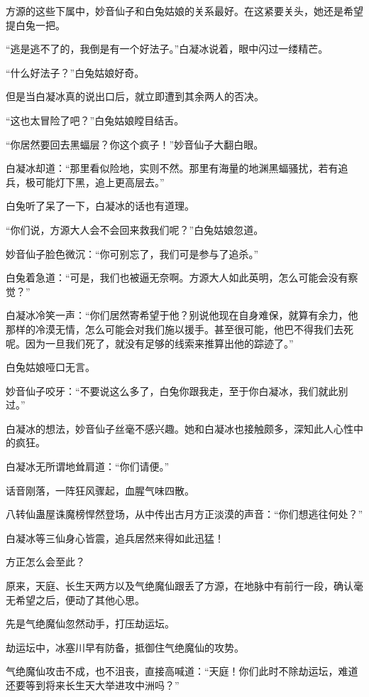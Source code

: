 \begin{this_body}
方源的这些下属中，妙音仙子和白兔姑娘的关系最好。在这紧要关头，她还是希望提白兔一把。

“逃是逃不了的，我倒是有一个好法子。”白凝冰说着，眼中闪过一缕精芒。

“什么好法子？”白兔姑娘好奇。

但是当白凝冰真的说出口后，就立即遭到其余两人的否决。

“这也太冒险了吧？”白兔姑娘瞠目结舌。

“你居然要回去黑蝠层？你这个疯子！”妙音仙子大翻白眼。

白凝冰却道：“那里看似险地，实则不然。那里有海量的地渊黑蝠骚扰，若有追兵，极可能灯下黑，追上更高层去。”

白兔听了呆了一下，白凝冰的话也有道理。

“你们说，方源大人会不会回来救我们呢？”白兔姑娘忽道。

妙音仙子脸色微沉：“你可别忘了，我们可是参与了追杀。”

白兔着急道：“可是，我们也被逼无奈啊。方源大人如此英明，怎么可能会没有察觉？”

白凝冰冷笑一声：“你们居然寄希望于他？别说他现在自身难保，就算有余力，他那样的冷漠无情，怎么可能会对我们施以援手。甚至很可能，他巴不得我们去死呢。因为一旦我们死了，就没有足够的线索来推算出他的踪迹了。”

白兔姑娘哑口无言。

妙音仙子咬牙：“不要说这么多了，白兔你跟我走，至于你白凝冰，我们就此别过。”

白凝冰的想法，妙音仙子丝毫不感兴趣。她和白凝冰也接触颇多，深知此人心性中的疯狂。

白凝冰无所谓地耸肩道：“你们请便。”

话音刚落，一阵狂风骤起，血腥气味四散。

八转仙蛊屋诛魔榜悍然登场，从中传出古月方正淡漠的声音：“你们想逃往何处？”

白凝冰等三仙身心皆震，追兵居然来得如此迅猛！

方正怎么会至此？

原来，天庭、长生天两方以及气绝魔仙跟丢了方源，在地脉中有前行一段，确认毫无希望之后，便动了其他心思。

先是气绝魔仙忽然动手，打压劫运坛。

劫运坛中，冰塞川早有防备，抵御住气绝魔仙的攻势。

气绝魔仙攻击不成，也不沮丧，直接高喊道：“天庭！你们此时不除劫运坛，难道还要等到将来长生天大举进攻中洲吗？”


\end{this_body}
